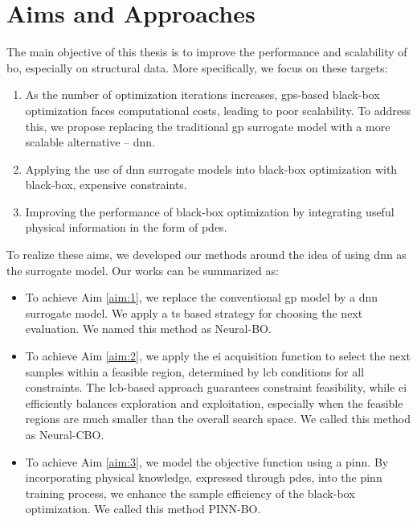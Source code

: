 \section{Aims and Approaches}
The main objective of this thesis is to improve the performance and scalability of \ac{bo}, especially on structural data.  More specifically, we focus on these targets:
\begin{enumerate}
    \item  As the number of optimization iterations increases, \acp{gp}-based black-box optimization faces computational costs, leading to poor scalability.
    To address this, we propose replacing the traditional \ac{gp} surrogate model with a more scalable alternative -- \ac{dnn}. \label{aim:1}
    \item Applying the use of \ac{dnn} surrogate models into black-box optimization with black-box, expensive constraints.  \label{aim:2}
    \item Improving the performance of black-box optimization by integrating useful physical information in the form of \acp{pde}. \label{aim:3}
\end{enumerate}
To realize these aims, we developed our methods around the idea of using \ac{dnn} as the surrogate model. Our works can be summarized as:
\begin{itemize}
    \item To achieve Aim \ref{aim:1}, we replace the conventional \ac{gp} model by a \ac{dnn} surrogate model. We apply a \acl{ts} based strategy for choosing the next evaluation. We named this method as Neural-BO.
    \item To achieve Aim \ref{aim:2}, we apply the \acf{ei} acquisition function to select the next samples within a feasible region, determined by \acf{lcb} conditions for all constraints. The \acs{lcb}-based approach guarantees constraint feasibility, while \acs{ei} efficiently balances exploration and exploitation, especially when the feasible regions are much smaller than the overall search space. We called this method as Neural-CBO.
    \item To achieve Aim \ref{aim:3}, we model the objective function using a \acf{pinn}. By incorporating physical knowledge, expressed through \acp{pde}, into the \ac{pinn} training process, we enhance the sample efficiency of the black-box optimization.  We called this method PINN-BO. 
\end{itemize}
